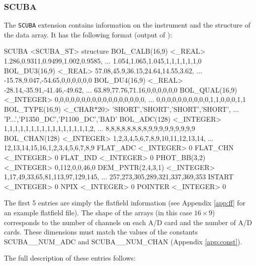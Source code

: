\documentclass[twoside,11pt,nolof]{starlink}
\providecommand{\task}[1]{\textsf{#1}}
\providecommand{\hdstrace}{\xref{\task{hdstrace}}{sun102}{}}
\begin{document}
\subsubsection{SCUBA}

The \texttt{SCUBA} extension contains information on the instrument and the
structure of the data array. It has the following format (output of
\hdstrace):

\begin{small}
\begin{terminalv}
SCUBA          <SCUBA_ST>      {structure}
   BOL_CALB(16,9)  <_REAL>        1.286,0.9311,0.9499,1.002,0.9585,
                                  ... 1.054,1.065,1.045,1,1,1,1,1,1,0
   BOL_DU3(16,9)  <_REAL>         57.08,45.9,36.15,24.64,14.55,3.62,
                                  ... -15.78,9.047,-54.65,0,0,0,0,0,0
   BOL_DU4(16,9)  <_REAL>         -28.14,-35.91,-41.46,-49.62,
                                  ... 63.89,77.76,71.16,0,0,0,0,0,0
   BOL_QUAL(16,9)  <_INTEGER>     0,0,0,0,0,0,0,0,0,0,0,0,0,0,0,0,0,
                                  ... 0,0,0,0,0,0,0,0,0,0,1,1,0,0,0,1,1
   BOL_TYPE(16,9)  <_CHAR*20>     'SHORT','SHORT','SHORT','SHORT',
                                  ... 'P...','P1350_DC','P1100_DC','BAD'
   BOL_ADC(128)   <_INTEGER>      1,1,1,1,1,1,1,1,1,1,1,1,1,1,1,1,2,
                                  ... 8,8,8,8,8,8,8,8,9,9,9,9,9,9,9,9,9
   BOL_CHAN(128)  <_INTEGER>      1,2,3,4,5,6,7,8,9,10,11,12,13,14,
                                  ... 12,13,14,15,16,1,2,3,4,5,6,7,8,9
   FLAT_ADC       <_INTEGER>      0
   FLAT_CHN       <_INTEGER>      0
   FLAT_IND       <_INTEGER>      0
   PHOT_BB(3,2)   <_INTEGER>      0,112,0,0,46,0
   DEM_PNTR(2,4,3,1)  <_INTEGER>   1,17,49,33,65,81,113,97,129,145,
                                   ... 257,273,305,289,321,337,369,353
   ISTART         <_INTEGER>      0
   NPIX           <_INTEGER>      0
   POINTER        <_INTEGER>      0
\end{terminalv}
\end{small}

The first 5 entries are simply the flatfield information (see Appendix
\ref{app:ff} for an example flatfield file). The shape of the arrays
(in this case $16\times9$) corresponds to the number of channels on each A/D
card and the number of A/D cards. These dimensions must match the values of
the constants SCUBA\_\_NUM\_ADC and SCUBA\_\_NUM\_CHAN (Appendix
\ref{app:const}).

The full description of these entries follows:
\end{document}
